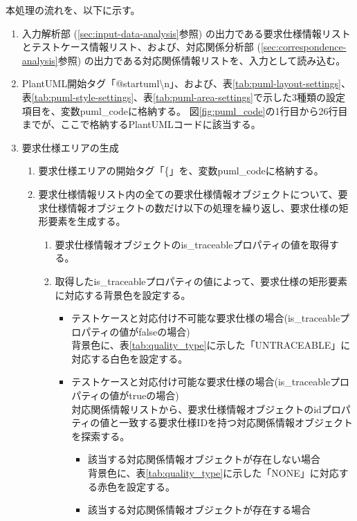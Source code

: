 本処理の流れを、以下に示す。
\begin{enumerate}
    \item 入力解析部 (\cref{sec:input-data-analysis}参照) の出力である要求仕様情報リストとテストケース情報リスト、および、対応関係分析部 (\cref{sec:correspondence-analysis}参照) の出力である対応関係情報リストを、入力として読み込む。
    \item PlantUML開始タグ「@startuml\textbackslash n」、および、表\ref{tab:puml-layout-settings}、表\ref{tab:puml-style-settings}、表\ref{tab:puml-area-settings}で示した3種類の設定項目を、変数puml\_codeに格納する。
    図\ref{fig:puml_code}の1行目から26行目までが、ここで格納するPlantUMLコードに該当する。
    \item 要求仕様エリアの生成
    \begin{enumerate}
        \item 要求仕様エリアの開始タグ「\{」を、変数puml\_codeに格納する。
        \item 要求仕様情報リスト内の全ての要求仕様情報オブジェクトについて、要求仕様情報オブジェクトの数だけ以下の処理を繰り返し、要求仕様の矩形要素を生成する。
        \begin{enumerate}
            \item 要求仕様情報オブジェクトのis\_traceableプロパティの値を取得する。
            \item 取得したis\_traceableプロパティの値によって、要求仕様の矩形要素に対応する背景色を設定する。
            \begin{itemize}
                \item テストケースと対応付け不可能な要求仕様の場合(is\_traceableプロパティの値がfalseの場合)\\
                背景色に、表\ref{tab:quality_type}に示した「UNTRACEABLE」に対応する白色を設定する。
                \item テストケースと対応付け可能な要求仕様の場合(is\_traceableプロパティの値がtrueの場合)\\
                対応関係情報リストから、要求仕様情報オブジェクトのidプロパティの値と一致する要求仕様IDを持つ対応関係情報オブジェクトを探索する。
                \begin{itemize}
                    \item 該当する対応関係情報オブジェクトが存在しない場合\\
                    背景色に、表\ref{tab:quality_type}に示した「NONE」に対応する赤色を設定する。
                    \item 該当する対応関係情報オブジェクトが存在する場合\\

\end{itemize}
\end{itemize}
\end{enumerate}
\end{enumerate}
\end{enumerate}
